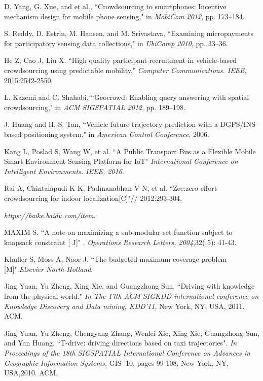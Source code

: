 \documentclass[journal]{IEEEtran}
\begin{document}
\begin{thebibliography}{1}
D. Yang, G. Xue, and et al., ``Crowdsourcing to smartphones: Incentive mechanism design for mobile phone sensing," in\textit{ MobiCom 2012}, pp. 173–184.

S. Reddy, D. Estrin, M. Hansen, and M. Srivastava, ``Examining micropayments for participatory sensing data collections," in \textit{UbiComp 2010}, pp. 33–36.

He Z, Cao J, Liu X. ``High quality participant recruitment in vehicle-based crowdsourcing using predictable mobility," \textit{Computer Communications. IEEE}, 2015:2542-2550.

L. Kazemi and C. Shahabi, ``Geocrowd: Enabling query answering with spatial crowdsourcing," in \textit{ACM SIGSPATIAL 2012}, pp. 189–198.

J. Huang and H.-S. Tan, ``Vehicle future trajectory prediction with a DGPS/INS-based positioning system," in \textit{American Control Conference}, 2006.

 Kang L, Poslad S, Wang W, et al. ``A Public Transport Bus as a Flexible Mobile Smart Environment Sensing Platform for IoT" \textit{ International Conference on Intelligent Environments. IEEE, 2016}.
 
 Rai A, Chintalapudi K K, Padmanabhan V N, et al. ``Zee:zero-effort crowdsourcing for indoor localization[C]"// 2012:293-304.
 
\textit{https://baike.baidu.com/item}.

 MAXIM S. ``A note on maximizing a sub-modular set function subject to knapsack constraint [ J]" . \textit{Operations Research Letters, 2004},32( 5): 41-43.
 
Khuller S, Moss A, Naor J. ``The budgeted maximum coverage problem [M]".\textit{Elsevier North-Holland}.

Jing Yuan, Yu Zheng, Xing Xie, and Guangzhong Sun. ``Driving with knowledge from the physical world." \textit{In The 17th ACM SIGKDD international conference on Knowledge Discovery and Data mining, KDD’11,} New York, NY, USA, 2011. ACM.

Jing Yuan, Yu Zheng, Chengyang Zhang, Wenlei Xie, Xing Xie, Guangzhong Sun, and Yan Huang. ``T-drive: driving directions based on taxi trajectories". \textit{In Proceedings of the 18th SIGSPATIAL International Conference on Advances in Geographic Information Systems,} GIS ’10, pages 99-108, New York, NY, USA,2010. ACM.

\end{thebibliography}
\end{document}
